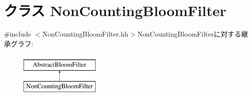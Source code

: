 \hypertarget{classNonCountingBloomFilter}{
\section{クラス NonCountingBloomFilter}
\label{classNonCountingBloomFilter}
}


{\ttfamily \#include $<$NonCountingBloomFilter.hh$>$}NonCountingBloomFilterに対する継承グラフ:\begin{figure}[H]
\begin{center}
\leavevmode
\includegraphics[height=2cm]{classNonCountingBloomFilter}
\end{center}
\end{figure}
